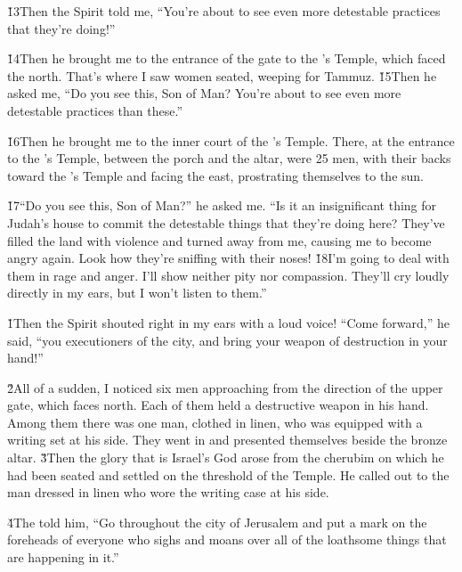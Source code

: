 \v{13}Then the Spirit told me, ``You're about to see even more detestable practices that they're doing!''

\v{14}Then he brought me to the entrance of the gate to the 's Temple, which faced the north. That's where I saw women seated, weeping for Tammuz. \v{15}Then he asked me, ``Do you see this, Son of Man? You're about to see even more detestable practices than these.''

\v{16}Then he brought me to the inner court of the 's Temple. There, at the entrance to the 's Temple, between the porch and the altar, were 25 men, with their backs toward the 's Temple and facing the east, prostrating themselves to the sun.

\v{17}``Do you see this, Son of Man?'' he asked me. ``Is it an insignificant thing for Judah's house to commit the detestable things that they're doing here? They've filled the land with violence and turned away from me, causing me to become angry again. Look how they're sniffing with their noses! \v{18}I'm going to deal with them in rage and anger. I'll show neither pity nor compassion. They'll cry loudly directly in my ears, but I won't listen to them.''

\v{1}Then the Spirit shouted right in my ears with a loud voice! ``Come forward,'' he said, ``you executioners of the city, and bring your weapon of destruction in your hand!''

\v{2}All of a sudden, I noticed six men approaching from the direction of the upper gate, which faces north. Each of them held a destructive weapon in his hand. Among them there was one man, clothed in linen, who was equipped with a writing set at his side. They went in and presented themselves beside the bronze altar. \v{3}Then the glory that is Israel's God arose from the cherubim on which he had been seated and settled on the threshold of the Temple. He called out to the man dressed in linen who wore the writing case at his side.

\v{4}The  told him, ``Go throughout the city of Jerusalem and put a mark on the foreheads of everyone who sighs and moans over all of the loathsome things that are happening in it.''

